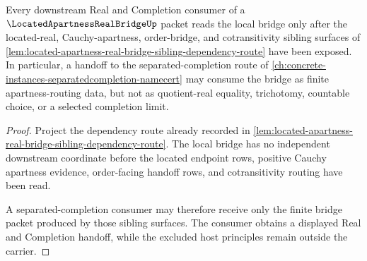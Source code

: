\begin{lemma}
Every downstream Real and Completion consumer of a $\LocatedApartnessRealBridgeUp$ packet reads the local bridge only after the located-real, Cauchy-apartness, order-bridge, and cotransitivity sibling surfaces of \autoref{lem:located-apartness-real-bridge-sibling-dependency-route} have been exposed. In particular, a handoff to the separated-completion route of \autoref{ch:concrete-instances-separatedcompletion-namecert} may consume the bridge as finite apartness-routing data, but not as quotient-real equality, trichotomy, countable choice, or a selected completion limit.
\end{lemma}
\begin{proof}
Project the dependency route already recorded in \autoref{lem:located-apartness-real-bridge-sibling-dependency-route}. The local bridge has no independent downstream coordinate before the located endpoint rows, positive Cauchy apartness evidence, order-facing handoff rows, and cotransitivity routing have been read.

A separated-completion consumer may therefore receive only the finite bridge packet produced by those sibling surfaces. The consumer obtains a displayed Real and Completion handoff, while the excluded host principles remain outside the carrier.
\end{proof}
